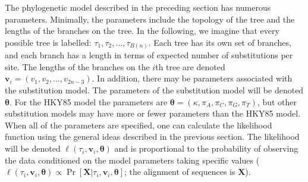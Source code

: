 \documentclass{svmult}
\begin{document}
The phylogenetic model described in the preceding section has numerous parameters. Minimally, the
parameters include the topology of the tree and the lengths of the branches on the tree. In the
following, we imagine that every possible tree is labelled: $\tau_1, \tau_2, \ldots, \tau_{B(n)}$.
Each tree has its own set of branches, and each branch has a length in terms of expected number of
substitutions per site. The lengths of the branches on the $i$th tree are denoted ${\mathbf v}_i =
(v_1, v_2, \ldots, v_{2n-3})$. In addition, there may be parameters associated with the
substitution model.  The parameters of the substitution model will be denoted ${\mathbf \theta}$.
For the HKY85 model the parameters are ${\mathbf \theta} = (\kappa, \pi_A, \pi_C, \pi_G, \pi_T)$,
but other substitution models may have more or fewer parameters than the HKY85 model.  When all of
the parameters are specified, one can calculate the likelihood function using the general ideas
described in the previous section. The likelihood will be denoted $\ell(\tau_i, {\mathbf v}_i,
{\mathbf \theta})$ and is proportional to the probability of observing the data conditioned on the
model parameters taking specific values ($\ell(\tau_i, {\mathbf v}_i, {\mathbf \theta}) \propto
\Pr[ {\mathbf X} |  \tau_i, {\mathbf v}_i, {\mathbf \theta} ] $; the alignment of sequences is
${\mathbf X}$).
\end{document}
